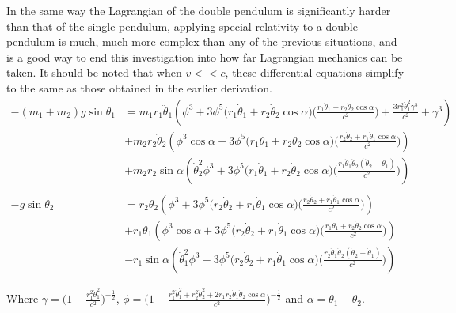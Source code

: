 \documentclass{article}
\begin{document}
 In the same way the Lagrangian of the double pendulum is significantly harder than that of the single pendulum, applying special relativity to a double pendulum is much, much more complex than any of the previous situations, and is a good way to end this investigation into how far Lagrangian mechanics can be taken. It should be noted that when \( v << c\), these differential equations simplify to the same as those obtained in the earlier derivation. 
\begin{align*}
- (m_{1} + m_{2}) g \sin{\theta_{1}} &=  m_{1} r_{1} \ddot{\theta}_{1} \left( \phi^3 + 3 \phi^5 \big(r_{1} \dot{\theta}_{1} + r_{2} \dot{\theta}_{2} \cos{\alpha} \big) \Big( \frac{ r_{1} \dot{\theta}_{1} + r_{2} \dot{\theta}_{2} \cos{\alpha}}{c^2} \Big) + \frac{3 r_{1}^2 \dot{\theta}_{1}^2 \gamma^5}{c^2} + \gamma^3 \right) \\ &+ m_{2} r_{2} \ddot{\theta}_{2} \left( \phi^3 \cos{\alpha} + 3 \phi^5 \big(r_{1} \dot{\theta}_{1} + r_{2} \dot{\theta}_{2} \cos{\alpha} \big) \Big( \frac{ r_{2} \dot{\theta}_{2} + r_{1} \dot{\theta}_{1} \cos{\alpha}}{c^2} \Big) \right) \\ &+ m_{2} r_{2} \sin{\alpha} \left( \dot{\theta}_{2}^2 \phi^3 + 3 \phi^5 \big(r_{1} \dot{\theta}_{1} + r_{2} \dot{\theta}_{2} \cos{\alpha} \big) \Big( \frac{r_{1} \dot{\theta}_{1} \dot{\theta}_{2} (\dot{\theta}_{2} - \dot{\theta}_{1})}{c^2} \Big) \right) \\ \\
- g \sin{\theta_{2}} &= r_{2} \ddot{\theta}_{2} \left( \phi^3 + 3 \phi^5 \big(r_{2} \dot{\theta}_{2} + r_{1} \dot{\theta}_{1} \cos{\alpha} \big) \Big( \frac{ r_{2} \dot{\theta}_{2} + r_{1} \dot{\theta}_{1} \cos{\alpha}}{c^2} \Big) \right) \\ &+ r_{1} \ddot{\theta}_{1} \left( \phi^3 \cos{\alpha} + 3 \phi^5 \big(r_{2} \dot{\theta}_{2} + r_{1} \dot{\theta}_{1} \cos{\alpha} \big) \Big( \frac{ r_{1} \dot{\theta}_{1} + r_{2} \dot{\theta}_{2} \cos{\alpha}}{c^2} \Big) \right) \\ &- r_{1} \sin{\alpha} \left( \dot{\theta}_{1}^2 \phi^3 - 3 \phi^5 \big(r_{2} \dot{\theta}_{2} + r_{1} \dot{\theta}_{1} \cos{\alpha} \big) \Big( \frac{r_{2} \dot{\theta}_{1} \dot{\theta}_{2} (\dot{\theta}_{2} - \dot{\theta}_{1})}{c^2} \Big) \right)
\end{align*}

\begin{center}
Where \( \gamma = \Big( 1 - \frac{r_{1}^2 \dot{\theta}_{1}^2}{c^2} \Big)^{-\frac{1}{2}} \), \( \phi = \Big( 1 - \frac{r_{1}^2 \dot{\theta}_{1}^2 + r_{2}^2 \dot{\theta}_{2}^2 + 2 r_{1} r_{2} \dot{\theta}_{1} \dot{\theta}_{2} \cos{\alpha}}{c^2} \Big)^{-\frac{1}{2}} \) and \( \alpha = \theta_{1} - \theta_{2} \).
\end{center} 
\end{document}
